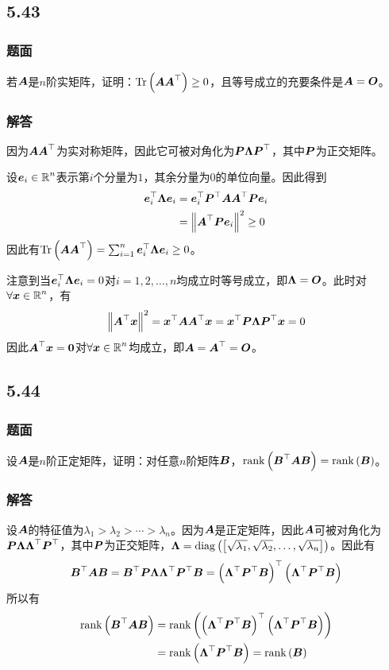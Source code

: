 \documentclass[9pt,xcolor=svgnames]{beamer} %
\begin{document}
\subsection*{5.43}
\begin{frame}
    \frametitle{题面}
    若\(\mata\)是\(n\)阶实矩阵，证明：\(\trace{\mata\mata^\top}\ge0\)，且等号成立的充要条件是\(\mata=\mato\)。
\end{frame}

\begin{frame}
    \frametitle{解答}
    因为\(\mata\mata^\top\)为实对称矩阵，因此它可被对角化为\(\matp\matlam\matp^\top\)，其中\(\matp\)为正交矩阵。

    设\(\vece_i\in\rea^n\)表示第\(i\)个分量为\(1\)，其余分量为\(0\)的单位向量。因此得到
    \begin{align*}
        \vece_i^\top\matlam\vece_i & =\vece_i^\top\matp^\top\mata\mata^\top\matp\vece_i \\
                                   & =\Abs{\mata^\top\matp\vece_i}^2\ge0
    \end{align*}
    因此有\(\trace{\mata\mata^\top}=\sum_{i=1}^n\vece_i^\top\matlam\vece_i\ge0\)。
    \pause

    注意到当\(\vece_i^\top\matlam\vece_i=0\)对\(i=1,2,\dots,n\)均成立时等号成立，即\(\matlam=\mato\)。此时对\(\forall\vecx\in\rea^n\)，有
    \begin{equation*}
        \Abs{\mata^\top\vecx}^2=\vecx^\top\mata\mata^\top\vecx=\vecx^\top\matp\matlam\matp^\top\vecx=0
    \end{equation*}
    因此\(\mata^\top\vecx=\veczero\)对\(\forall\vecx\in\rea^n\)均成立，即\(\mata=\mata^\top=\mato\)。
\end{frame}

\subsection*{5.44}
\begin{frame}
    \frametitle{题面}
    设\(\mata\)是\(n\)阶正定矩阵，证明：对任意\(n\)阶矩阵\(\matb\)，\(\rank{\matb^\top\mata\matb}=\rank{\matb}\)。
\end{frame}

\begin{frame}
    \frametitle{解答}
    设\(\mata\)的特征值为\(\lambda_1>\lambda_2>\cdots>\lambda_n\)。因为\(\mata\)是正定矩阵，因此\(\mata\)可被对角化为\(\matp\matlam\matlam^\top\matp^\top\)，其中\(\matp\)为正交矩阵，\(\matlam=\diag{\mat{\sqrt{\lambda_1},\sqrt{\lambda_2},\dots,\sqrt{\lambda_n}}}\)。因此有
    \begin{equation*}
        \matb^\top\mata\matb=\matb^\top\matp\matlam\matlam^\top\matp^\top\matb=\spar{\matlam^\top\matp^\top\matb}^\top\spar{\matlam^\top\matp^\top\matb}
    \end{equation*}
    \pause
    所以有
    \begin{align*}
        \rank{\matb^\top\mata\matb} & =\rank{\spar{\matlam^\top\matp^\top\matb}^\top\spar{\matlam^\top\matp^\top\matb}} \\
                                    & =\rank{\matlam^\top\matp^\top\matb}=\rank{\matb}
    \end{align*}
\end{frame}
\end{document}
